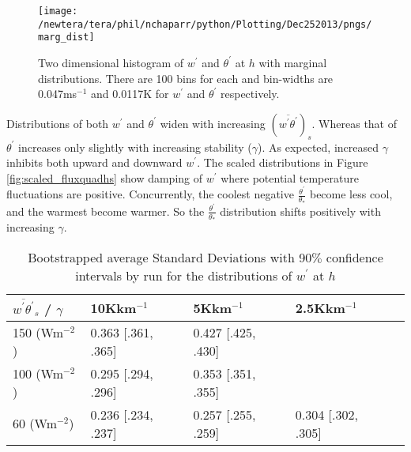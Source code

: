 \begin{figure}[htbp]
\centering
 \texttt{[image: /newtera/tera/phil/nchaparr/python/Plotting/Dec252013/pngs/marg\_dist]}                 
\caption[]{Two dimensional histogram of $w^{'}$ and $\theta^{'}$ at $h$ with marginal distributions. There are 100 bins for each and bin-widths are 0.047ms$^{-1}$ and 0.0117K for $w^{'}$ and $\theta^{'}$ respectively.}
\label{fig:margdist}
\end{figure}

Distributions of both $w^{'}$ and $\theta^{'}$ widen with increasing $(\overline{w^{'}\theta^{'}})_{s}$.  Whereas that of $\theta^{'}$ increases only slightly with increasing stability ($\gamma$).  As expected, increased $\gamma$ inhibits both upward and downward $w^{'}$. The scaled distributions in Figure \ref{fig:scaled_fluxquadhs} show damping of $w^{'}$ where potential temperature fluctuations are positive. Concurrently, the coolest negative $\frac{\theta^{'}}{\theta_{*}}$ become less cool, and the warmest become warmer.  So the $\frac{\theta^{'}}{\theta_{*}}$ distribution shifts positively with increasing $\gamma$.\\ 


\begin{table}[htbp]
\caption[]{Bootstrapped average Standard Deviations with 90$\%$ confidence intervals by run for the distributions of $w^{'}$ at $h$}
    \begin{tabular}{ p{2.1cm} p{2.2cm}  p{2.2cm}  p{2.2cm} p{2.2cm} }
     $\overline{w^{'}\theta^{'}}_{s}$ / $\gamma$ & 10Kkm$^{-1}$ & 5Kkm$^{-1}$  & 2.5Kkm$^{-1}$   \\ \hline
     150 (Wm$^{-2}$)& 0.363 [.361, .365]& 0.427 [.425, .430] &  \\
     100 (Wm$^{-2}$)& 0.295 [.294, .296] & 0.353 [.351, .355]& \\
     60 (Wm$^{-2}$) & 0.236 [.234, .237]& 0.257 [.255, .259] & 0.304 [.302, .305]\\ \hline
     
    \end{tabular}
\label{tab:stdevw}   
\end{table}


